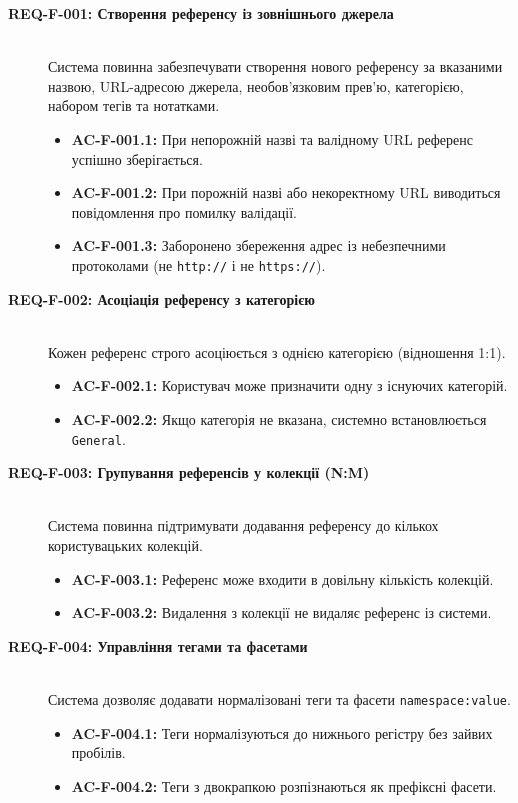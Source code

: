 \documentclass[12pt,a4paper]{article}
\begin{document}
\begin{description}
    \item[\textbf{REQ-F-001: Створення референсу із зовнішнього джерела}] \hfill \\
    Система повинна забезпечувати створення нового референсу за вказаними назвою, URL-адресою джерела, необов'язковим прев'ю, категорією, набором тегів та нотатками.
    \begin{itemize}[noitemsep]
        \item \textbf{AC-F-001.1:} При непорожній назві та валідному URL референс успішно зберігається.
        \item \textbf{AC-F-001.2:} При порожній назві або некоректному URL виводиться повідомлення про помилку валідації.
        \item \textbf{AC-F-001.3:} Заборонено збереження адрес із небезпечними протоколами (не \texttt{http://} і не \texttt{https://}).
    \end{itemize}

    \item[\textbf{REQ-F-002: Асоціація референсу з категорією}] \hfill \\
    Кожен референс строго асоціюється з однією категорією (відношення 1:1).
    \begin{itemize}[noitemsep]
        \item \textbf{AC-F-002.1:} Користувач може призначити одну з існуючих категорій.
        \item \textbf{AC-F-002.2:} Якщо категорія не вказана, системно встановлюється \texttt{General}.
    \end{itemize}

    \item[\textbf{REQ-F-003: Групування референсів у колекції (N:M)}] \hfill \\
    Система повинна підтримувати додавання референсу до кількох користувацьких колекцій.
    \begin{itemize}[noitemsep]
        \item \textbf{AC-F-003.1:} Референс може входити в довільну кількість колекцій.
        \item \textbf{AC-F-003.2:} Видалення з колекції не видаляє референс із системи.
    \end{itemize}

    \item[\textbf{REQ-F-004: Управління тегами та фасетами}] \hfill \\
    Система дозволяє додавати нормалізовані теги та фасети \texttt{namespace:value}.
    \begin{itemize}[noitemsep]
        \item \textbf{AC-F-004.1:} Теги нормалізуються до нижнього регістру без зайвих пробілів.
        \item \textbf{AC-F-004.2:} Теги з двокрапкою розпізнаються як префіксні фасети.
    \end{itemize}


\end{description}
\end{document}
